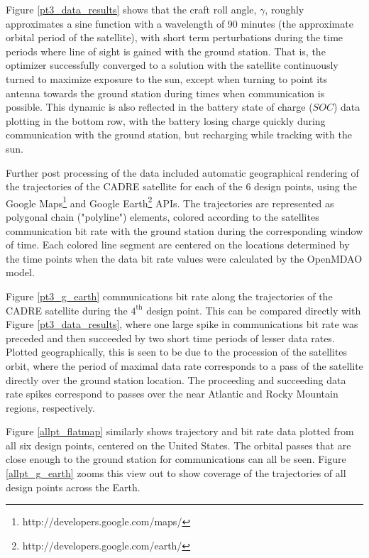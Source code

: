 \documentclass[]{aiaa-tc} %
\begin{document}
Figure \ref{pt3_data_results} shows that the craft roll angle, $\gamma$, roughly approximates a sine function
with a wavelength of 90 minutes (the approximate orbital period of the satellite),
with short term perturbations during the time
periods where line of sight is gained with the ground station. That is, the optimizer successfully
converged to a solution with the satellite continuously turned to maximize exposure to the sun,
except when turning to point its antenna towards the ground station during times when
communication is possible. This dynamic is also reflected in the battery state of charge ($SOC$)
data plotting in the bottom row, with the battery losing charge quickly during
communication with the ground station, but recharging while tracking with the sun.

Further post processing of the data included automatic geographical rendering of the trajectories of
the CADRE satellite for each of the 6 design points, using the Google
Maps\footnote{http://developers.google.com/maps/} and Google
Earth\footnote{http://developers.google.com/earth/} APIs. The trajectories are
represented as polygonal chain ("polyline") elements, colored according to the
satellites communication bit rate with the ground station during the corresponding
window of time. Each colored line segment are centered on the locations
determined by the time points when the data bit rate values were calculated
by the OpenMDAO model.

Figure \ref{pt3_g_earth} communications bit rate along the trajectories of the
CADRE satellite during the $4^{\textrm{th}}$ design point. This can be compared
directly with Figure \ref{pt3_data_results}, where one large spike in communications
bit rate was preceded and then succeeded by two short time periods of lesser
data rates. Plotted geographically, this is seen to be due to the procession of
the satellites orbit, where the period of maximal data rate corresponds to a
pass of the satellite directly over the ground station location. The proceeding and
succeeding data rate spikes correspond to passes over the near Atlantic and
Rocky Mountain regions, respectively.


Figure \ref{allpt_flatmap} similarly shows trajectory and bit rate data plotted
from all six design points, centered on the United States. The orbital passes
that are close enough to the ground station for communications can all be seen.
Figure \ref{allpt_g_earth} zooms this view out to show coverage of the trajectories
of all design points across the Earth.
\end{document}
